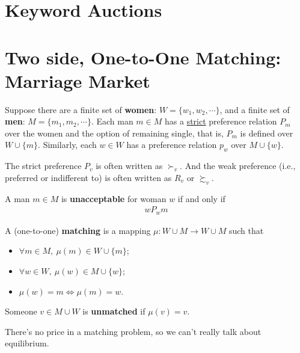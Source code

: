 \documentclass{article}
\begin{document}
	\section{Keyword Auctions}
	
	\section{Two side, One-to-One Matching: Marriage Market}
	\begin{definition}
		Suppose there are a finite set of \textbf{women}: $W = \{w_1, w_2, \cdots\}$, and a finite set of \textbf{men}: $M = \{m_1, m_2, \cdots\}$. Each man $m \in M$ has a \ul{strict} preference relation $P_m$ over the women and the option of remaining single, that is, $P_m$ is defined over $W \cup \{m\}$. Similarly, each $w \in W$ has a preference relation $p_w$ over $M \cup \{w\}$.
	\end{definition}
	
	\begin{notation}
		The strict preference $P_v$ is often written as $\succ_v$. And the weak preference (i.e., preferred or indifferent to) is often written as $R_v$ or $\succsim_v$.
	\end{notation}
	
	\begin{definition}
		A man $m \in M$ is \textbf{unacceptable} for woman $w$ if and only if
		\begin{align}
			w P_w m
		\end{align}
	\end{definition}
	
	\begin{definition}
		A (one-to-one) \textbf{matching} is a mapping $\mu: W \cup M \to W \cup M$ such that
		\begin{itemize}
			\item $\forall m \in M,\ \mu(m) \in W \cup \{m\}$;
			\item $\forall w \in W,\ \mu(w) \in M \cup \{w\}$;
			\item $\mu(w) = m \iff \mu(m) = w$.
		\end{itemize}
	\end{definition}
	
	\begin{remark}
		Someone $v \in M \cup W$ is \textbf{unmatched} if $\mu(v) = v$.
	\end{remark}
	
	\begin{remark}
		There's no price in a matching problem, so we can't really talk about equilibrium.
	\end{remark}
	
\end{document}

